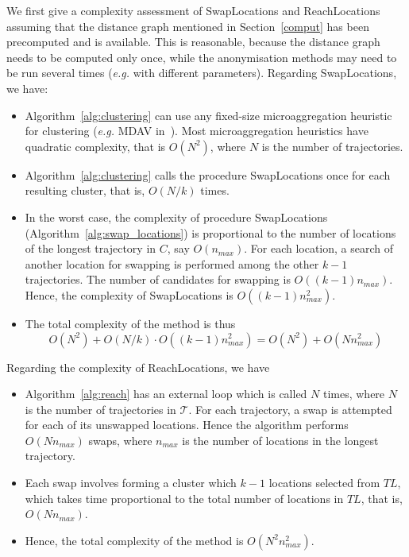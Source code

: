 We first give a complexity assessment of SwapLocations and
ReachLocations assuming that the distance graph
mentioned in Section~\ref{comput}
has been precomputed and is available.
This is reasonable, because
the distance graph needs to be computed only once, while the anonymisation
methods may need to be run several times ({\em e.g.} with different parameters).
Regarding SwapLocations, we have:
\begin{itemize}
\item Algorithm~\ref{alg:clustering} can use
any fixed-size microaggregation heuristic for clustering
({\em e.g.} MDAV in~\cite{domingo05}). Most microaggregation heuristics
have quadratic complexity, that is $O(N^2)$, where $N$ is the number
of trajectories.
\item Algorithm~\ref{alg:clustering} calls the procedure
SwapLocations once for each resulting cluster, that is,
$O(N/k)$ times.
\item In the worst case, the complexity of procedure SwapLocations
(Algorithm~\ref{alg:swap_locations}) is proportional
to the number of locations of the longest trajectory in $C$,
say $O(n_{max})$.
For each location, a search of another
location for swapping is performed among
the other $k-1$ trajectories. The number of candidates
for swapping is $O((k-1)n_{max})$. Hence, the complexity
of SwapLocations is $O((k-1)n^2_{max})$.
\item The total complexity of the method is thus
\begin{equation}
\label{compswaplocations}
O(N^2) + O(N/k)\cdot O((k-1)n^2_{max}) = O(N^2) + O(N n^2_{max})
\end{equation}
\end{itemize}

Regarding the complexity of ReachLocations, we have
\begin{itemize}
\item Algorithm~\ref{alg:reach} has an external loop
which is called $N$ times, where $N$ is the number
of trajectories in $\mathcal{T}$. For each trajectory,
a swap is attempted for each of its unswapped locations.
Hence the algorithm performs $O(N n_{max})$ swaps,
where $n_{max}$ is the number of locations in the longest
trajectory.
\item Each swap involves forming a cluster which $k-1$ locations
selected from $TL$,
which takes time
proportional to the total number of locations in $TL$,
that is, $O(N n_{max})$.
\item Hence, the total complexity of the method is $O(N^2 n^2_{max})$.
\end{itemize}


